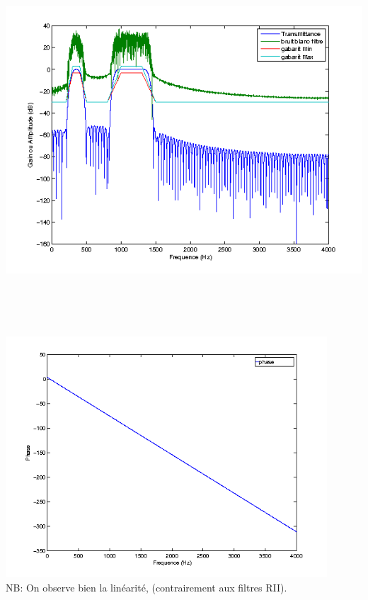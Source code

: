 \documentclass{article}
\begin{document}
\inputminted[linenos,lastline=21]{matlab}{RIF.m}
\includegraphics[height=13cm]{RIF_1}
\inputminted[linenos,firstnumber=25,firstline=25,lastline=25]{matlab}{RIF.m}
\includegraphics[height=9cm]{RIF_2}\\
NB: On observe bien la linéarité, (contrairement aux filtres RII).\\
\inputminted[linenos,firstnumber=30,firstline=30,lastline=36]{matlab}{RIF.m}
\end{document}

